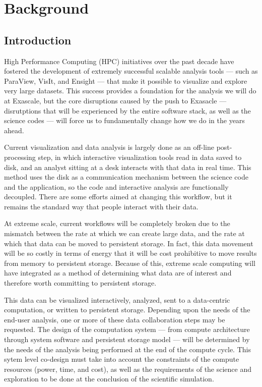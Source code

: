 \section{Background}
\label{sec:Background}

\subsection{Introduction}

High Performance Computing (HPC) initiatives over the past decade have 
fostered the development of extremely successful scalable analysis tools ---
such as ParaView, VisIt, and Ensight --- that make it possible to visualize 
and explore very large datasets.  This success provides a foundation for 
the analysis we will do at Exascale, but the core disruptions caused by
the push to Exasacle --- disrutptions that will be experienced by the entire
software stack, as well as the science codes --- will force us to fundamentally
change how we do \vda in the years ahead.

Current visualization and data analysis is largely done as an off-line
post-processing step, in which interactive visualization tools read in data
saved to disk, and an analyst sitting at a desk interacts with that data in
real time.  This method uses the disk as a communication mechanism between
the science code and the \vda application, so the code and interactive
analysis are functionally decoupled.  There are some efforts aimed at
changing this workflow, but it remains the standard way that people
interact with their data.

At extreme scale, current workflows will be completely broken due to 
the mismatch
between the rate at which we can create large data, and the rate at
which that data can be moved to persistent storage.  In fact, this
data movement will be so costly in terms of energy that it will be
cost prohibitive to move results from memory to persistent storage.
Because of this, extreme scale computing will have integrated \vda as a
method of determining what data are of interest and therefore worth
committing to persistent storage.

This data can be visualized interactively, analyzed,
sent to a data-centric computation, or written to persistent
storage.  Depending upon the needs of the end-user analysis, one or
more of these data collaboration steps may be requested.  The design
of the computation system --- from compute architecture through system
software and persistent storage model --- will be determined by the
needs of the analysis being performed at the end of the compute
cycle.  This sytem level co-design must take into account the
constraints of the compute resources (power, time, and cost), as
well as the requirements of the science and exploration to be done
at the conclusion of the scientific simulation.

